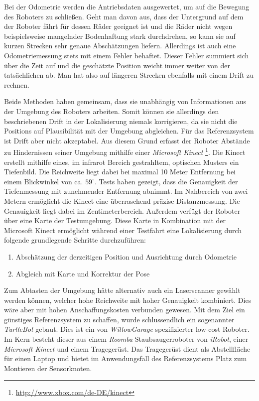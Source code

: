 Bei der Odometrie werden die Antriebsdaten ausgewertet, um auf die Bewegung
des Roboters zu schließen. Geht man davon aus, dass der Untergrund auf dem der
Roboter fährt für dessen Räder geeignet ist und die Räder nicht wegen
beispielsweise mangelnder Bodenhaftung stark durchdrehen, so kann sie auf
kurzen Strecken sehr genaue Abschätzungen liefern. Allerdings ist auch eine
Odometriemessung stets mit einem Fehler behaftet. Dieser Fehler summiert sich
über die Zeit auf und die geschätzte Position weicht immer weiter von der
tatsächlichen ab. Man hat also auf längeren Strecken ebenfalls mit einem Drift
zu rechnen.

Beide Methoden haben gemeinsam, dass sie unabhängig von Informationen aus der
Umgebung des Roboters arbeiten. Somit können sie allerdings den beschriebenen
Drift in der Lokalisierung niemals korrigieren, da sie nicht die Positions auf
Plausibilität mit der Umgebung abgleichen.  Für das Referenzsystem ist Drift
aber nicht akzeptabel. Aus diesem Grund erfasst der Roboter Abstände zu
Hindernissen seiner Umgebung mithilfe einer \textit{Microsoft Kinect}
\footnote{\url{http://www.xbox.com/de-DE/kinect}}. Die
Kinect erstellt mithilfe eines, im infrarot Bereich gestrahltem, optischen
Musters ein Tiefenbild.  Die Reichweite liegt dabei bei maximal 10 Meter
Entfernung bei einem Blickwinkel von ca. $59^{\circ}$.
Tests haben gezeigt, dass die Genauigkeit der Tiefenmessung mit zunehmender
Entfernung abnimmt. Im Nahbereich von zwei Metern ermöglicht die Kinect eine überraschend präzise
Distanzmessung. Die Genauigkeit liegt dabei im Zentimeterbereich.  Außerdem verfügt der Roboter
über eine Karte der Testumgebung. Diese Karte in Kombination mit der
Microsoft Kinect ermöglicht während einer Testfahrt eine Lokalisierung
durch folgende grundlegende Schritte durchzuführen:

\begin{enumerate}
  \item Abschätzung der derzeitigen Position und Ausrichtung durch Odometrie
  \item Abgleich mit Karte und Korrektur der Pose
\end{enumerate}

Zum Abtasten der Umgebung hätte alternativ auch ein Laserscanner gewählt werden
können, welcher hohe Reichweite mit hoher Genauigkeit kombiniert. Dies wäre
aber mit hohen Anschaffungskosten verbunden gewesen. Mit dem Ziel ein günstiges
Referenzsystem zu schaffen, wurde schlussendlich ein sogenannter
\textit{TurtleBot} gebaut. Dies ist ein von \textit{WillowGarage}
spezifizierter low-cost Roboter.
Im Kern besteht dieser aus einem \textit{Roomba} Staubsaugerroboter von
\textit{iRobot}, einer \textit{Microsoft Kinect} und einem Tragegerüst. Das
Tragegerüst dient als Abstellfläche für einen Laptop und bietet im
Anwendungsfall des Referenzsystems Platz zum Montieren der Sensorknoten.

